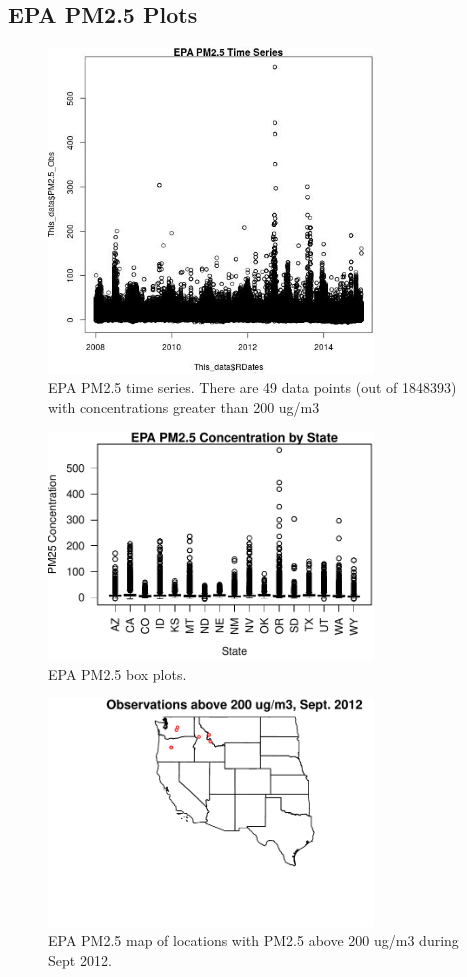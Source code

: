 \subsection{EPA PM2.5 Plots}
\begin{figure} 
\centering 
\includegraphics[width=0.77\textwidth]{Code_Outputs/EPA_PM25_time_series.jpg} 
\caption{\label{fig:EPA_PM25TS}EPA PM2.5 time series. There are 49 data points (out of 1848393) with concentrations greater than 200 ug/m3} 
\end{figure} 
 

\begin{figure} 
\centering 
\includegraphics[width=0.77\textwidth]{Code_Outputs/EPA_PM25_state_boxplots.pdf} 
\caption{\label{fig:EPA_PM25BP}EPA PM2.5 box plots.} 
\end{figure} 
 

\begin{figure} 
\centering 
\includegraphics[width=0.77\textwidth]{Code_Outputs/EPA_PM25Sep2012High_map.pdf} 
\caption{\label{fig:EPA_PM25S12}EPA PM2.5 map of locations with PM2.5 above 200 ug/m3 during Sept 2012.} 
\end{figure} 
 
